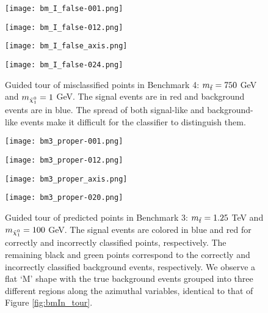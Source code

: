 \begin{figure}[htbp]
\centering
  \begin{minipage}[htbp]{0.4\textwidth}
    \centering
    \texttt{[image: bm\_I\_false-001.png]}
  \end{minipage}
  \begin{minipage}[htbp]{0.4\textwidth}
    \centering
    \texttt{[image: bm\_I\_false-012.png]}
  \end{minipage}
  \begin{minipage}[htbp]{0.4\textwidth}
    \centering
    \texttt{[image: bm\_I\_false\_axis.png]}
  \end{minipage}
  \begin{minipage}[htbp]{0.4\textwidth}
    \centering
    \texttt{[image: bm\_I\_false-024.png]}
  \end{minipage}
  \caption{Guided tour of misclassified points in Benchmark 4: $m_{\Tilde{t}} = 750$ GeV and $m_{\Tilde{\chi}_1^0} = 1$ GeV. The signal events are in red and background events are in blue. The spread of both signal-like and background-like events make it difficult for the classifier to distinguish them.}
  \label{fig:bmInF_tour}
\end{figure}



\begin{figure}[htbp]
\centering
  \begin{minipage}[htbp]{0.4\textwidth}
    \centering
    \texttt{[image: bm3\_proper-001.png]}
  \end{minipage}
  \begin{minipage}[htbp]{0.4\textwidth}
    \centering
    \texttt{[image: bm3\_proper-012.png]}
  \end{minipage}
  \begin{minipage}[htbp]{0.4\textwidth}
    \centering
    \texttt{[image: bm3\_proper\_axis.png]}
  \end{minipage}
  \begin{minipage}[htbp]{0.4\textwidth}
    \centering
    \texttt{[image: bm3\_proper-020.png]}
  \end{minipage}
  \caption{Guided tour of predicted points in Benchmark 3: $m_{\Tilde{t}} = 1.25$ TeV and $m_{\Tilde{\chi}_1^0} = 100$ GeV. The signal events are colored in blue and red for correctly and incorrectly classified points, respectively. The remaining black and green points correspond to the correctly and incorrectly classified background events, respectively. We observe a flat `M' shape with the true background events grouped into three different regions along the azimuthal variables, identical to that of Figure \ref{fig:bmIn_tour}.}
  \label{fig:bm3_tour}
\end{figure}

